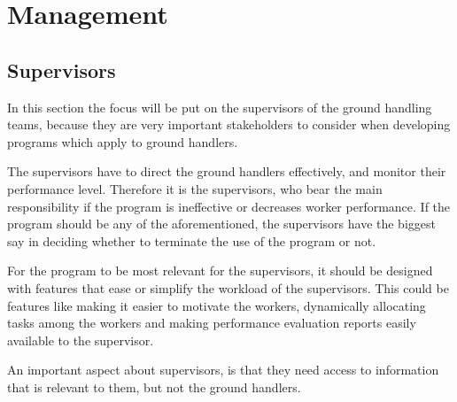 \section{Management}
\subsection{Supervisors}
In this section the focus will be put on the supervisors of the ground handling teams, because they are very important stakeholders to consider when developing programs which apply to ground handlers.

The supervisors have to direct the ground handlers effectively, and monitor their performance level. Therefore it is the supervisors, who bear the main responsibility if the program is ineffective or decreases worker performance. If the program should be any of the aforementioned, the supervisors have the biggest say in deciding whether to terminate the use of the program or not.

For the program to be most relevant for the supervisors, it should be designed with features that ease or simplify the workload of the supervisors. This could be features like making it easier to motivate the workers, dynamically allocating tasks among the workers and making performance evaluation reports easily available to the supervisor.

An important aspect about supervisors, is that they need access to information that is relevant to them, but not the ground handlers.